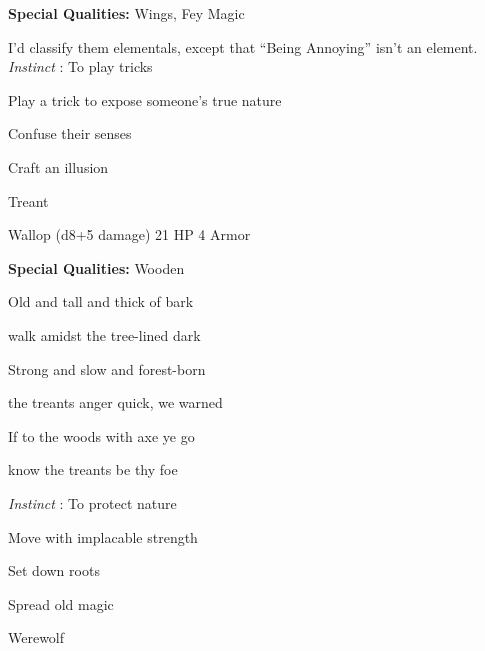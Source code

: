  


 
\startMonsterQualities
{\bf Special Qualities:}  Wings, Fey Magic
\stopMonsterQualities
 
\startMonsterDescription
I’d classify them elementals, except that “Being Annoying” isn’t an element. {\em Instinct} : To play tricks
\stopMonsterDescription
 
\startitemize[1,packed]

\item Play a trick to expose someone's true nature

 
\item Confuse their senses

 
\item Craft an illusion


\stopitemize
 
\startMonsterName
Treant	 
\stopMonsterName
 

Wallop (d8+5 damage)	21 HP	4 Armor

 


 
\startMonsterQualities
{\bf Special Qualities:}  Wooden
\stopMonsterQualities
 
\startMonsterDescription
Old and tall and thick of bark
\stopMonsterDescription
 

walk amidst the tree-lined dark

 

Strong and slow and forest-born

 

the treants anger quick, we warned

 

If to the woods with axe ye go

 

know the treants be thy foe

 

{\em Instinct} : To protect nature

 
\startitemize[1,packed]

\item Move with implacable strength

 
\item Set down roots

 
\item Spread old magic


\stopitemize
 
\startMonsterName
Werewolf	 
\stopMonsterName
 

